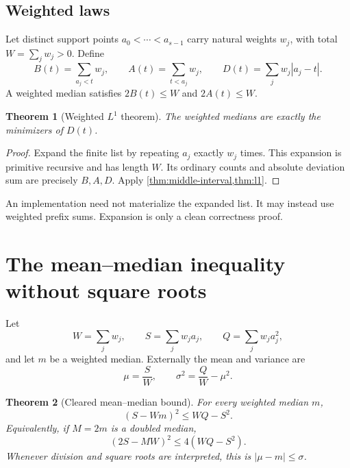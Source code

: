 \documentclass[11pt]{article}
\newtheorem{theorem}{Theorem}[section]
\newcommand{\abs}[1]{\left|#1\right|}
\begin{document}
\subsection{Weighted laws}

Let distinct support points $a_0<\cdots<a_{s-1}$ carry natural weights
$w_j$, with total $W=\sum_jw_j>0$.  Define
\[
 B(t)=\sum_{a_j<t}w_j,\qquad A(t)=\sum_{t<a_j}w_j,
 \qquad D(t)=\sum_jw_j\abs{a_j-t}.
\]
A weighted median satisfies $2B(t)\leq W$ and $2A(t)\leq W$.

\begin{theorem}[Weighted $L^1$ theorem]\label{thm:weighted-l1}
The weighted medians are exactly the minimizers of $D(t)$.
\end{theorem}

\begin{proof}
Expand the finite list by repeating $a_j$ exactly $w_j$ times.  This expansion
is primitive recursive and has length $W$.  Its ordinary counts and absolute
deviation sum are precisely $B,A,D$.  Apply \cref{thm:middle-interval,thm:l1}.
\end{proof}

An implementation need not materialize the expanded list.  It may instead use
weighted prefix sums.  Expansion is only a clean correctness proof.

\section{The mean--median inequality without square roots}

Let
\[
 W=\sum_jw_j,\qquad S=\sum_jw_ja_j,\qquad
 Q=\sum_jw_ja_j^2,
\]
and let $m$ be a weighted median.  Externally the mean and variance are
\[
 \mu=\frac SW,\qquad \sigma^2=\frac QW-\mu^2.
\]

\begin{theorem}[Cleared mean--median bound]\label{thm:mean-median}
For every weighted median $m$,
\begin{equation}\label{eq:mean-median-cleared}
  (S-Wm)^2\leq WQ-S^2.
\end{equation}
Equivalently, if $M=2m$ is a doubled median,
\begin{equation}\label{eq:mean-median-doubled}
  (2S-MW)^2\leq 4(WQ-S^2).
\end{equation}
Whenever division and square roots are interpreted, this is
$\abs{\mu-m}\leq\sigma$.
\end{theorem}
\end{document}
